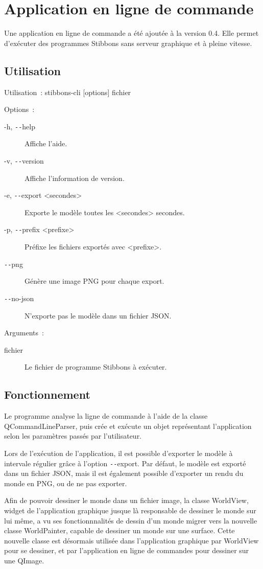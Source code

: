 \section{Application en ligne de commande}

Une application en ligne de commande a été ajoutée à la version 0.4. Elle permet d'exécuter des programmes Stibbons sans serveur graphique et à pleine vitesse.

\subsection{Utilisation}

Utilisation~: stibbons-cli [options] fichier

Options~:
\begin{description}
	\item[-h, \texttt{-{}-}help] Affiche l'aide.
	\item[-v, \texttt{-{}-}version] Affiche l'information de version.
	\item[-e, \texttt{-{}-}export <secondes>] Exporte le modèle toutes les <secondes> secondes.
	\item[-p, \texttt{-{}-}prefix <prefixe>] Préfixe les fichiers exportés avec <prefixe>.
	\item[\texttt{-{}-}png] Génère une image PNG pour chaque export.
	\item[\texttt{-{}-}no-json] N'exporte pas le modèle dans un fichier JSON.
\end{description}

Arguments~:
\begin{description}
	\item[fichier] Le fichier de programme Stibbons à exécuter.
\end{description}

\subsection{Fonctionnement}

Le programme analyse la ligne de commande à l'aide de la classe QCommandLineParser, puis crée et exécute un objet représentant l'application selon les paramètres passés par l'utilisateur.

Lors de l'exécution de l'application, il est possible d'exporter le modèle à intervale régulier grâce à l'option \texttt{-{}-}export. Par défaut, le modèle est exporté dans un fichier JSON, mais il est également possible d'exporter un rendu du monde en PNG, ou de ne pas exporter.

Afin de pouvoir dessiner le monde dans un fichier image, la classe WorldView, widget de l'application graphique jusque là responsable de dessiner le monde sur lui même, a vu ses fonctionnnalités de dessin d'un monde migrer vers la nouvelle classe WorldPainter, capable de dessiner un monde sur une surface.
Cette nouvelle classe est désormais utilisée dans l'application graphique par WorldView pour se dessiner, et par l'application en ligne de commandes pour dessiner sur une QImage.
